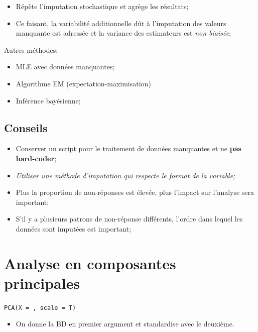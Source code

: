 \documentclass[10pt, french]{article}
\begin{document}
\begin{multicols*}{3}
\begin{enumerate}[leftmargin = *]
		\begin{itemize}[leftmargin = *]
		\item	Répète l'imputation stochastique et agrège les résultats;
		\item	Ce faisant, la variabilité additionnelle dût à l'imputation des valeurs manquante est adressée et la variance des estimateurs est \textit{non biaisée};
		\end{itemize}
\end{enumerate}

Autres méthodes:
\begin{itemize}[leftmargin = *]
	\item	MLE avec données manquantes;
	\item	Algorithme EM (expectation-maximisation)
	\item	Inférence bayésienne;
\end{itemize}

\subsection*{Conseils}
\begin{itemize}[leftmargin = *]
	\item	Conserver un script pour le traitement de données manquantes et ne \textbf{pas hard-coder};
	\item	\textit{Utiliser une méthode d'imputation qui respecte le format de la variable;}
	\item	Plus la proportion de non-réponses est élevée, plus l'impact sur l'analyse sera important;
	\item	S'il y a plusieurs patrons de non-réponse différents, l'ordre dans lequel les données sont imputées est important;
\end{itemize}

\newpage

\section{Analyse en composantes principales}

\begin{definitionNOHFILLsub}
\texttt{PCA(X = , scale = T)}
\begin{itemize}
	\item	On donne la BD en premier argument et standardise avec le deuxième.
\end{itemize}
\end{definitionNOHFILLsub}


\end{multicols*}
\end{document}

